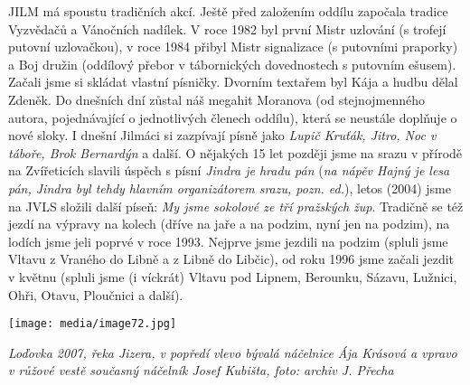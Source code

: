 JILM má spoustu tradičních akcí. Ještě před založením oddílu započala
tradice Vyzvědačů a Vánočních nadílek. V roce 1982 byl první Mistr
uzlování (s trofejí putovní uzlovačkou), v roce 1984 přibyl Mistr
signalizace (s putovními praporky) a Boj družin (oddílový přebor v
tábornických dovednostech s putovním ešusem). Začali jsme si skládat
vlastní písničky. Dvorním textařem byl Kája a hudbu dělal Zdeněk. Do
dnešních dní zůstal náš megahit Moranova (od stejnojmenného autora,
pojednávající o jednotlivých členech oddílu), která se neustále doplňuje
o nové sloky. I dnešní Jilmáci si zazpívají písně jako \emph{Lupič
Kruťák, Jitro, Noc v táboře, Brok Bernardýn} a další. O nějakých 15 let
později jsme na srazu v přírodě na Zvířeticích slavili úspěch s písní
\emph{Jindra je hradu pán} (\emph{na nápěv Hajný je lesa pán, Jindra byl
tehdy hlavním organizátorem srazu, pozn. ed.}), letos (2004) jsme na
JVLS složili další píseň: \emph{My jsme sokolové ze tří pražských žup}.
Tradičně se též jezdí na výpravy na kolech (dříve na jaře a na podzim,
nyní jen na podzim), na lodích jsme jeli poprvé v roce 1993. Nejprve
jsme jezdili na podzim (spluli jsme Vltavu z Vraného do Libně a z Libně
do Libčic), od roku 1996 jsme začali jezdit v květnu (spluli jsme (i
víckrát) Vltavu pod Lipnem, Berounku, Sázavu, Lužnici, Ohři, Otavu,
Ploučnici a další).

\texttt{[image: media/image72.jpg]}

\emph{Loďovka 2007, řeka Jizera, v popředí vlevo bývalá náčelnice Ája
Krásová a vpravo v růžové vestě současný náčelník Josef Kubišta, foto:
archiv J. Přecha}

